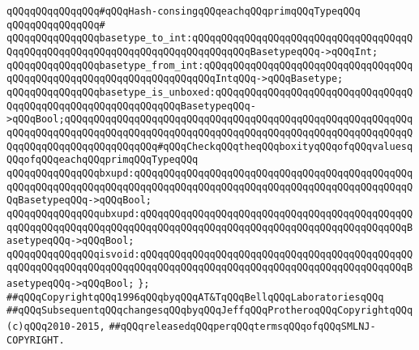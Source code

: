 \newline
\verb|qQQqqQQqqQQqqQQq#qQQqHash-consingqQQqeachqQQqprimqQQqTypeqQQq|\newline
\verb|qQQqqQQqqQQqqQQq#|\newline
\verb|qQQqqQQqqQQqqQQqbasetype_to_int:qQQqqQQqqQQqqQQqqQQqqQQqqQQqqQQqqQQqqQQqqQQqqQQqqQQqqQQqqQQqqQQqqQQqqQQqqQQqqQQqBasetypeqQQq->qQQqInt;|\newline
\verb|qQQqqQQqqQQqqQQqbasetype_from_int:qQQqqQQqqQQqqQQqqQQqqQQqqQQqqQQqqQQqqQQqqQQqqQQqqQQqqQQqqQQqqQQqqQQqqQQqIntqQQq->qQQqBasetype;|\newline
\newline
\verb|qQQqqQQqqQQqqQQqbasetype_is_unboxed:qQQqqQQqqQQqqQQqqQQqqQQqqQQqqQQqqQQqqQQqqQQqqQQqqQQqqQQqqQQqqQQqBasetypeqQQq->qQQqBool;qQQqqQQqqQQqqQQqqQQqqQQqqQQqqQQqqQQqqQQqqQQqqQQqqQQqqQQqqQQqqQQqqQQqqQQqqQQqqQQqqQQqqQQqqQQqqQQqqQQqqQQqqQQqqQQqqQQqqQQqqQQqqQQqqQQqqQQqqQQqqQQqqQQqqQQqqQQq#qQQqCheckqQQqtheqQQqboxityqQQqofqQQqvaluesqQQqofqQQqeachqQQqprimqQQqTypeqQQq|\newline
\newline
\verb|qQQqqQQqqQQqqQQqbxupd:qQQqqQQqqQQqqQQqqQQqqQQqqQQqqQQqqQQqqQQqqQQqqQQqqQQqqQQqqQQqqQQqqQQqqQQqqQQqqQQqqQQqqQQqqQQqqQQqqQQqqQQqqQQqqQQqqQQqqQQqBasetypeqQQq->qQQqBool;|\newline
\verb|qQQqqQQqqQQqqQQqubxupd:qQQqqQQqqQQqqQQqqQQqqQQqqQQqqQQqqQQqqQQqqQQqqQQqqQQqqQQqqQQqqQQqqQQqqQQqqQQqqQQqqQQqqQQqqQQqqQQqqQQqqQQqqQQqqQQqqQQqBasetypeqQQq->qQQqBool;|\newline
\newline
\verb|qQQqqQQqqQQqqQQqisvoid:qQQqqQQqqQQqqQQqqQQqqQQqqQQqqQQqqQQqqQQqqQQqqQQqqQQqqQQqqQQqqQQqqQQqqQQqqQQqqQQqqQQqqQQqqQQqqQQqqQQqqQQqqQQqqQQqqQQqBasetypeqQQq->qQQqBool;|\newline
\verb|};|\newline
\newline
\newline
\newline
\verb|##qQQqCopyrightqQQq1996qQQqbyqQQqAT&TqQQqBellqQQqLaboratoriesqQQq|\newline
\verb|##qQQqSubsequentqQQqchangesqQQqbyqQQqJeffqQQqProtheroqQQqCopyrightqQQq(c)qQQq2010-2015,|\newline
\verb|##qQQqreleasedqQQqperqQQqtermsqQQqofqQQqSMLNJ-COPYRIGHT.|\newline

